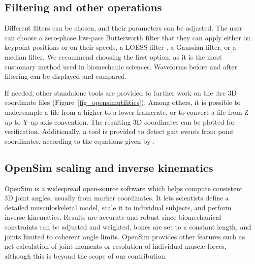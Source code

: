 \subsection{Filtering and other operations}

Different filters can be chosen, and their parameters can be adjusted. The user can choose a zero-phase low-pass Butterworth filter \cite{Butterworth1930} that they can apply either on keypoint positions or on their speeds, a LOESS filter \cite{Cleveland1981}, a Gaussian filter, or a median filter. We recommend choosing the first option, as it is the most customary method used in biomechanic sciences. Waveforms before and after filtering can be displayed and compared.

\FloatBarrier
If needed, other standalone tools are provided to further work on the .trc 3D coordinate files (Figure~\ref{fig_opensimutilities}). Among others, it is possible to undersample a file from a higher to a lower framerate, or to convert a file from Z-up to Y-up axis convention. The resulting 3D coordinates can be plotted for verification. Additionally, a tool is provided to detect gait events from point coordinates, according to the equations given by \cite{Zeni2008}.


\subsection{OpenSim scaling and inverse kinematics}

OpenSim \cite{Delp2007,Seth2018} is a widespread open-source software which helps compute consistent 3D joint angles, usually from marker coordinates. It lets scientists define a detailed musculoskeletal model, scale it to individual subjects, and perform inverse kinematics. Results are accurate and robust since biomechanical constraints can be adjusted and weighted, bones are set to a constant length, and joints limited to coherent angle limits. OpenSim provides other features such as net calculation of joint moments or resolution of individual muscle forces, although this is beyond the scope of our contribution.

